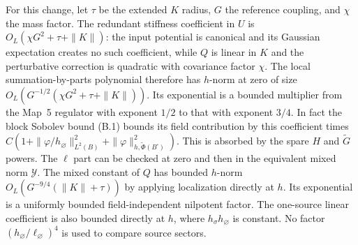 \documentclass[11pt]{article}
\begin{document}
For this change, let \(\tau\) be the extended \(K\) radius,
\(G\) the reference coupling, and \(\chi\) the mass factor.
The redundant stiffness coefficient in \(U\) is
\(O_L(\chi G^2+\tau+\|K\|)\): the input potential is
canonical and its Gaussian expectation creates no such
coefficient, while \(Q\) is linear in \(K\) and the
perturbative correction is quadratic with covariance
factor \(\chi\). The local summation-by-parts polynomial
therefore has \(h\)-norm at zero of size
\(O_L(G^{-1/2}(\chi G^2+\tau+\|K\|))\).
Its exponential is a bounded multiplier from the
Map~5 regulator with exponent \(1/2\) to that with exponent
\(3/4\). In fact the block Sobolev bound (B.1) bounds
its field contribution by this coefficient times
\(C(1+\| \varphi/h_\varnothing\|_{L^2(B)}^2+
\|\varphi\|_{h,\widetilde\Phi(B^\square)}^2)\).
This is absorbed by the spare \(H\) and \(\widetilde G\)
powers. The \(\ell\) part can be checked at zero and
then in the equivalent mixed norm \(\mathcal Y\).
The mixed constant of \(Q\) has bounded \(h\)-norm
\(O_L(G^{-9/4}(\|K\|+\tau))\) by applying localization
directly at \(h\). Its exponential is a uniformly
bounded field-independent nilpotent factor.
The one-source linear coefficient is also bounded directly
at \(h\), where \(h_\sigma h_\varnothing\) is constant.
No factor \((h_\varnothing/\ell_\varnothing)^4\) is
used to compare source sectors.
\end{document}
